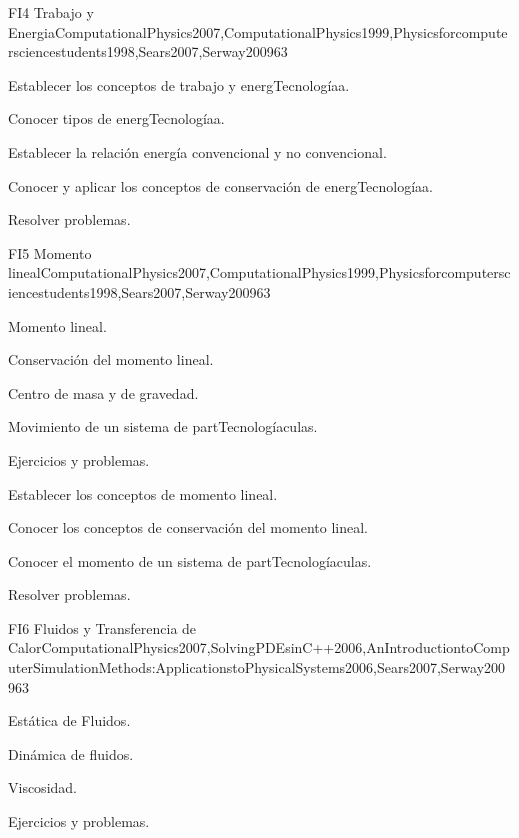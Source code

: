 \begin{syllabus}
\begin{unit}{FI4 Trabajo y Energia}{ComputationalPhysics2007,ComputationalPhysics1999,Physicsforcomputersciencestudents1998,Sears2007,Serway2009}{6}{3}
   \begin{unitgoals}
      \item Establecer los conceptos de trabajo y energTecnologíaa.
      \item Conocer tipos de energTecnologíaa.
      \item Establecer la relación energía convencional y no convencional.
      \item Conocer y aplicar los conceptos de conservación de energTecnologíaa.
      \item Resolver problemas.
   \end{unitgoals}
\end{unit}

\begin{unit}{FI5 Momento lineal}{ComputationalPhysics2007,ComputationalPhysics1999,Physicsforcomputersciencestudents1998,Sears2007,Serway2009}{6}{3}
\begin{topics}
      \item Momento lineal.
      \item Conservación del momento lineal.
      \item Centro de masa y de gravedad.
      \item Movimiento de un sistema de partTecnologíaculas.
      \item Ejercicios y problemas.
  \end{topics}

   \begin{unitgoals}
      \item Establecer los conceptos de momento lineal.
      \item Conocer los conceptos de conservación del momento lineal.
      \item Conocer el momento de un sistema de partTecnologíaculas.
      \item Resolver problemas.
   \end{unitgoals}
\end{unit}

\begin{unit}{FI6 Fluidos y Transferencia de Calor}{ComputationalPhysics2007,SolvingPDEsinC++2006,AnIntroductiontoComputerSimulationMethods:ApplicationstoPhysicalSystems2006,Sears2007,Serway2009}{6}{3}
\begin{topics}
      \item Estática de Fluidos.
      \item Dinámica de fluidos. 
      \item Viscosidad.
      \item Ejercicios y problemas.
  \end{topics}


\end{unit}
\end{syllabus}
